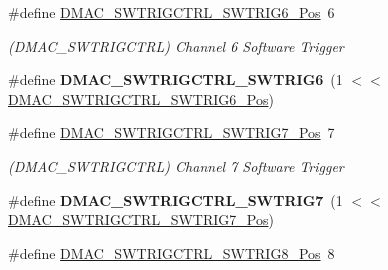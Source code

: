 \begin{DoxyCompactItemize}
\item 
\hypertarget{group___s_a_m_l21___d_m_a_c_ga141efe2f93312e6265efd668ebb2da10}{}\#define \hyperlink{group___s_a_m_l21___d_m_a_c_ga141efe2f93312e6265efd668ebb2da10}{D\+M\+A\+C\+\_\+\+S\+W\+T\+R\+I\+G\+C\+T\+R\+L\+\_\+\+S\+W\+T\+R\+I\+G6\+\_\+\+Pos}~6\label{group___s_a_m_l21___d_m_a_c_ga141efe2f93312e6265efd668ebb2da10}

\begin{DoxyCompactList}\small\item\em (D\+M\+A\+C\+\_\+\+S\+W\+T\+R\+I\+G\+C\+T\+R\+L) Channel 6 Software Trigger \end{DoxyCompactList}\item 
\hypertarget{group___s_a_m_l21___d_m_a_c_ga9be77ec68ecf5349adee987101de5d92}{}\#define {\bfseries D\+M\+A\+C\+\_\+\+S\+W\+T\+R\+I\+G\+C\+T\+R\+L\+\_\+\+S\+W\+T\+R\+I\+G6}~(1 $<$$<$ \hyperlink{group___s_a_m_l21___d_m_a_c_ga141efe2f93312e6265efd668ebb2da10}{D\+M\+A\+C\+\_\+\+S\+W\+T\+R\+I\+G\+C\+T\+R\+L\+\_\+\+S\+W\+T\+R\+I\+G6\+\_\+\+Pos})\label{group___s_a_m_l21___d_m_a_c_ga9be77ec68ecf5349adee987101de5d92}

\item 
\hypertarget{group___s_a_m_l21___d_m_a_c_gae6013d5233071b7ca12b65bc868eae19}{}\#define \hyperlink{group___s_a_m_l21___d_m_a_c_gae6013d5233071b7ca12b65bc868eae19}{D\+M\+A\+C\+\_\+\+S\+W\+T\+R\+I\+G\+C\+T\+R\+L\+\_\+\+S\+W\+T\+R\+I\+G7\+\_\+\+Pos}~7\label{group___s_a_m_l21___d_m_a_c_gae6013d5233071b7ca12b65bc868eae19}

\begin{DoxyCompactList}\small\item\em (D\+M\+A\+C\+\_\+\+S\+W\+T\+R\+I\+G\+C\+T\+R\+L) Channel 7 Software Trigger \end{DoxyCompactList}\item 
\hypertarget{group___s_a_m_l21___d_m_a_c_gad8cbc8c3fbbd3a66a331117b6365aef2}{}\#define {\bfseries D\+M\+A\+C\+\_\+\+S\+W\+T\+R\+I\+G\+C\+T\+R\+L\+\_\+\+S\+W\+T\+R\+I\+G7}~(1 $<$$<$ \hyperlink{group___s_a_m_l21___d_m_a_c_gae6013d5233071b7ca12b65bc868eae19}{D\+M\+A\+C\+\_\+\+S\+W\+T\+R\+I\+G\+C\+T\+R\+L\+\_\+\+S\+W\+T\+R\+I\+G7\+\_\+\+Pos})\label{group___s_a_m_l21___d_m_a_c_gad8cbc8c3fbbd3a66a331117b6365aef2}

\item 
\hypertarget{group___s_a_m_l21___d_m_a_c_ga87e5acebf240a2ecb15907625e50a301}{}\#define \hyperlink{group___s_a_m_l21___d_m_a_c_ga87e5acebf240a2ecb15907625e50a301}{D\+M\+A\+C\+\_\+\+S\+W\+T\+R\+I\+G\+C\+T\+R\+L\+\_\+\+S\+W\+T\+R\+I\+G8\+\_\+\+Pos}~8\label{group___s_a_m_l21___d_m_a_c_ga87e5acebf240a2ecb15907625e50a301}


\end{DoxyCompactItemize}
